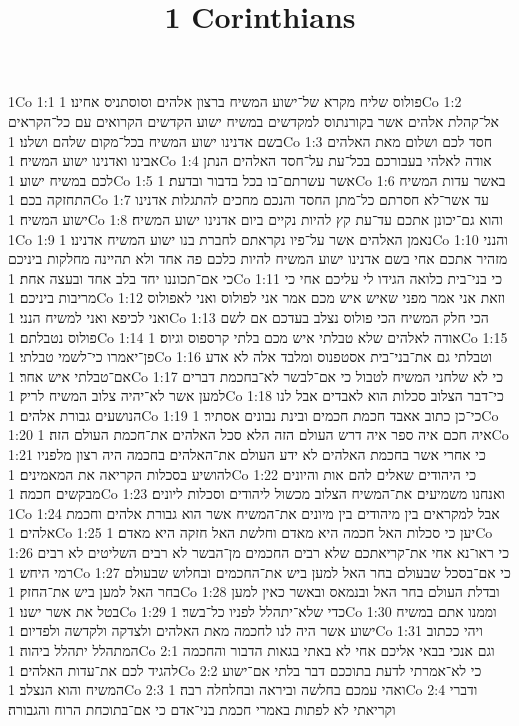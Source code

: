 

\title{1 Corinthians}

1Co 1:1  פולוס שליח מקרא של־ישוע המשיח ברצון אלהים וסוסתניס אחינו׃
1Co 1:2  אל־קהלת אלהים אשר בקורנתוס למקדשים במשיח ישוע הקדשים הקרואים עם כל־הקראים בשם אדנינו ישוע המשיח בכל־מקום שלהם ושלנו׃
1Co 1:3  חסד לכם ושלום מאת האלהים אבינו ואדנינו ישוע המשיח׃
1Co 1:4  אודה לאלהי בעבורכם בכל־עת על־חסד האלהים הנתן לכם במשיח ישוע׃
1Co 1:5  אשר עשרתם־בו בכל בדבור ובדעת׃
1Co 1:6  באשר עדות המשיח התחזקה בכם׃
1Co 1:7  עד אשר־לא חסרתם כל־מתן החסד והנכם מחכים להתגלות אדנינו ישוע המשיח׃
1Co 1:8  והוא גם־יכונן אתכם עד־עת קץ להיות נקיים ביום אדנינו ישוע המשיח׃
1Co 1:9  נאמן האלהים אשר על־פיו נקראתם לחברת בנו ישוע המשיח אדנינו׃
1Co 1:10  והנני מזהיר אתכם אחי בשם אדנינו ישוע המשיח להיות כלכם פה אחד ולא תהיינה מחלקות ביניכם כי אם־תכוננו יחד בלב אחד ובעצה אחת׃
1Co 1:11  כי בני־בית כלואה הגידו לי עליכם אחי כי מריבות ביניכם׃
1Co 1:12  וזאת אני אמר מפני שאיש איש מכם אמר אני לפולוס ואני לאפולוס ואני לכיפא ואני למשיח הנני׃
1Co 1:13  הכי חלק המשיח הכי פולוס נצלב בעדכם אם לשם פולוס נטבלתם׃
1Co 1:14  אודה לאלהים שלא טבלתי איש מכם בלתי קרספוס וגיוס׃
1Co 1:15  פן־יאמרו כי־לשמי טבלתי׃
1Co 1:16  וטבלתי גם את־בני־בית אסטפנוס ומלבד אלה לא אדע אם־טבלתי איש אחר׃
1Co 1:17  כי לא שלחני המשיח לטבול כי אם־לבשר לא־בחכמת דברים למען אשר לא־יהיה צלוב המשיח לריק׃
1Co 1:18  כי־דבר הצלוב סכלות הוא לאבדים אבל לנו הנושעים גבורת אלהים׃
1Co 1:19  כי־כן כתוב אאבד חכמת חכמים ובינת נבונים אסתיר׃
1Co 1:20  איה חכם איה ספר איה דרש העולם הזה הלא סכל האלהים את־חכמת העולם הזה׃
1Co 1:21  כי אחרי אשר בחכמת האלהים לא ידע העולם את־האלהים בחכמה היה רצון מלפניו להושיע בסכלות הקריאה את המאמינים׃
1Co 1:22  כי היהודים שאלים להם אות והיונים מבקשים חכמה׃
1Co 1:23  ואנחנו משמיעים את־המשיח הצלוב מכשול ליהודים וסכלות ליונים׃
1Co 1:24  אבל למקראים בין מיהודים בין מיונים את־המשיח אשר הוא גבורת אלהים וחכמת אלהים׃
1Co 1:25  יען כי סכלות האל חכמה היא מאדם וחלשת האל חזקה היא מאדם׃
1Co 1:26  כי ראו־נא אחי את־קריאתכם שלא רבים החכמים מן־הבשר לא רבים השליטים לא רבים רמי היחש׃
1Co 1:27  כי אם־בסכל שבעולם בחר האל למען ביש את־החכמים ובחלוש שבעולם בחר האל למען ביש את־החזק׃
1Co 1:28  ובדלת העולם בחר האל ובנמאס ובאשר כאין למען בטל את אשר ישנו׃
1Co 1:29  כדי שלא־יתהלל לפניו כל־בשר׃
1Co 1:30  וממנו אתם במשיח ישוע אשר היה לנו לחכמה מאת האלהים ולצדקה ולקדשה ולפדיום׃
1Co 1:31  ויהי ככתוב המתהלל יתהלל ביהוה׃
1Co 2:1  וגם אנכי בבאי אליכם אחי לא באתי בגאות הדבור והחכמה להגיד לכם את־עדות האלהים׃
1Co 2:2  כי לא־אמרתי לדעת בתוככם דבר בלתי אם־ישוע המשיח והוא הנצלב׃
1Co 2:3  ואהי עמכם בחלשה וביראה ובחלחלה רבה׃
1Co 2:4  ודברי וקריאתי לא לפתות באמרי חכמת בני־אדם כי אם־בתוכחת הרוח והגבורה׃

